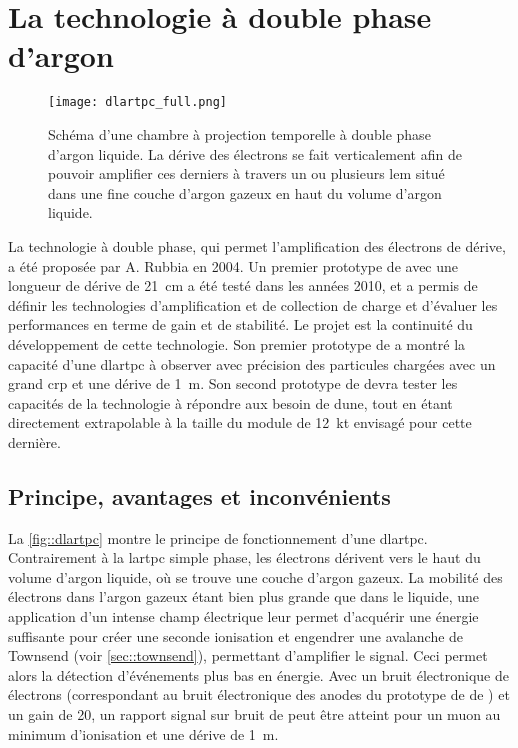     
  \section{La technologie à double phase d'argon}
 
    \begin{figure}[htbp]
      \centering
      \texttt{[image: dlartpc\_full.png]}
      \caption[Schéma d'une chambre à projection temporelle à double phase d'argon liquide]{\label{fig::dlartpc}Schéma d'une chambre à projection temporelle à double phase d'argon liquide. La dérive des électrons se fait verticalement afin de pouvoir amplifier ces derniers à travers un ou plusieurs \acrfull{lem} situé dans une fine couche d'argon gazeux en haut du volume d'argon liquide.}
    \end{figure}

    La technologie à double phase, qui permet l'amplification des électrons de dérive, a été proposée par A. Rubbia\cite{Rubbia2004} en 2004. Un premier prototype de \threeL{} avec une longueur de dérive de \SI{21}{\centi\meter} a été testé dans les années 2010, et a permis de définir les technologies d'amplification et de collection de charge\cite{Cantini2013} et d'évaluer les performances en terme de gain et de stabilité\cite{Cantini2014}. Le projet \protodp{} est la continuité du développement de cette technologie. Son premier prototype de \TOO{} a montré la capacité d'une \gls{dlartpc} à observer avec précision des particules chargées avec un grand \gls{crp} et une dérive de \SI{1}{\meter}. Son second prototype de \SSS{} devra tester les capacités de la technologie à répondre aux besoin de \gls{dune}, tout en étant directement extrapolable à la taille du module de \SI{12}{\kilo\tonne} envisagé pour cette dernière.

    \subsection{Principe, avantages et inconvénients}

      La \autoref{fig::dlartpc} montre le principe de fonctionnement d'une \gls{dlartpc}. Contrairement à la \gls{lartpc} simple phase, les électrons dérivent vers le haut du volume d'argon liquide, où se trouve une couche d'argon gazeux. La mobilité des électrons dans l'argon gazeux étant bien plus grande que dans le liquide, une application d'un intense champ électrique leur permet d'acquérir une énergie suffisante pour créer une seconde ionisation et engendrer une avalanche de Townsend (voir \autoref{sec::townsend}), permettant d'amplifier le signal. Ceci permet alors la détection d'événements plus bas en énergie. Avec un bruit électronique de  électrons (correspondant au bruit électronique des anodes du prototype de \TOO{} de \protodp{}) et un gain de 20, un rapport signal sur bruit de  peut être atteint pour un muon au minimum d'ionisation et une dérive de \SI{1}{\meter}.
      
